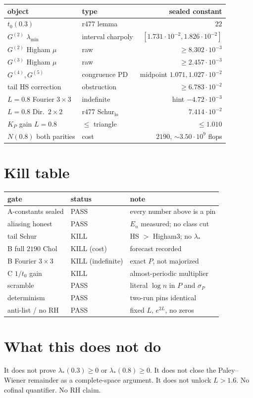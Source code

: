 \documentclass[11pt]{article}
\theoremstyle{remark}
\begin{document}
\begin{center}
\small
\begin{tabular}{@{}llr@{}}
\toprule
object & type & sealed constant\\
\midrule
$t_0(0.3)$ & r477 lemma & $22$\\
$G^{(2)}$ $\lambda_{\min}$ & interval charpoly & $[1.731\cdot10^{-2},1.826\cdot10^{-2}]$\\
$G^{(2)}$ Higham $\mu$ & raw & $\ge8.302\cdot10^{-3}$\\
$G^{(3)}$ Higham $\mu$ & raw & $\ge2.457\cdot10^{-3}$\\
$G^{(4)},G^{(5)}$ & congruence PD & midpoint $1.071,1.027\cdot10^{-2}$\\
tail HS correction & obstruction & $\ge6.783\cdot10^{-2}$\\
$L=0.8$ Fourier $3\times3$ & indefinite & hint $-4.72\cdot10^{-3}$\\
$L=0.8$ Dir.\ $2\times2$ & r477 Schur$_{\mathrm{lo}}$ & $7.414\cdot10^{-2}$\\
$K_P$ gain $L=0.8$ & $\le$ triangle & $\le1.010$\\
$N(0.8)$ both parities & cost & $2190$, $\sim3.50\cdot10^9$ flops\\
\bottomrule
\end{tabular}
\end{center}

\section{Kill table}

\begin{center}
\small
\begin{tabular}{@{}lll@{}}
\toprule
gate & status & note\\
\midrule
A-constants sealed & PASS & every number above is a pin\\
aliasing honest & PASS & $E_n$ measured; no class cut\\
tail Schur & KILL & HS $>$ Higham3; no $\lambda_*$\\
B full $2190$ Chol & KILL (cost) & forecast recorded\\
B Fourier $3\times3$ & KILL (indefinite) & exact $P$, not majorized\\
C $1/t_0$ gain & KILL & almost-periodic multiplier\\
scramble & PASS & literal $\log n$ in $P$ and $\sigma_P$\\
determinism & PASS & two-run pins identical\\
anti-list / no RH & PASS & fixed $L$, $e^{2L}$, no zeros\\
\bottomrule
\end{tabular}
\end{center}

\section{What this does not do}

It does not prove $\lambda_*(0.3)\ge0$ or $\lambda_*(0.8)\ge0$.
It does not close the Paley--Wiener remainder as a complete-space
argument.  It does not unlock $L>1.6$.  No cofinal quantifier.
No RH claim.
\end{document}
